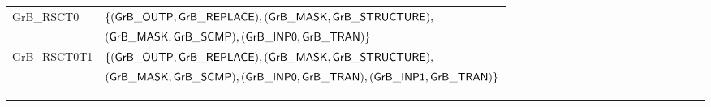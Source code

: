 \begin{table}[htbp]
\begin{center}
\begin{small}
\begin{tabular}{l|l}
		{\sf GrB\_RSCT0}	& $\{ ({\sf GrB\_OUTP},{\sf GrB\_REPLACE})  , ({\sf GrB\_MASK},{\sf GrB\_STRUCTURE}),                       $ 	\\
					& $   ({\sf GrB\_MASK},{\sf GrB\_SCMP})     , ({\sf GrB\_INP0},{\sf GrB\_TRAN})                         \}$	\\
		{\sf GrB\_RSCT0T1}	& $\{ ({\sf GrB\_OUTP},{\sf GrB\_REPLACE})  , ({\sf GrB\_MASK},{\sf GrB\_STRUCTURE}),		        $	\\
					& $   ({\sf GrB\_MASK},{\sf GrB\_SCMP})     , ({\sf GrB\_INP0},{\sf GrB\_TRAN}), ({\sf GrB\_INP1},{\sf GrB\_TRAN})  \}$ 	\\
	    \end{tabular}
	\end{small}

    \end{center}
    \hrule
\end{table}

